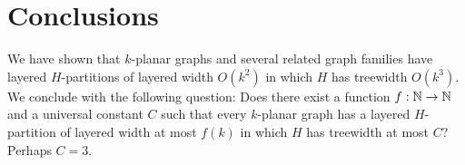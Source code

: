 \documentclass{patmorin}
\newcommand{\note}[2]{{\color{red}[#1:~#2]}}
\begin{document}
% 
% 
% 
% 

\section{Conclusions}

We have shown that $k$-planar graphs and several related graph families have layered $H$-partitions of layered width $O(k^2)$ in which $H$ has treewidth $O(k^3)$.  We conclude with the following question:  Does there exist a function $f:\mathbb{N}\to\mathbb{N}$ and a universal constant $C$ such that every $k$-planar graph has a layered $H$-partition of layered width at most $f(k)$ in which $H$ has treewidth at most $C$?  Perhaps $C=3$.



\end{document}
